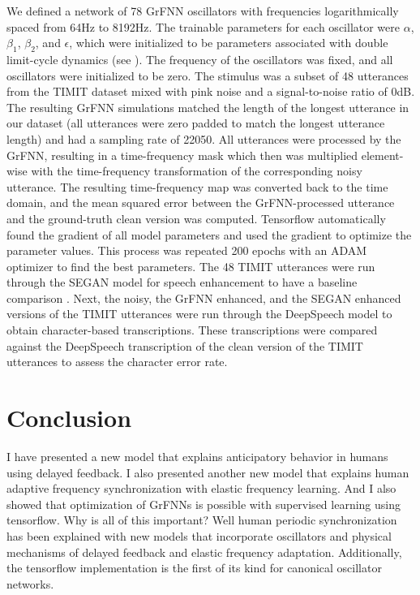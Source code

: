 \documentclass{report}
\begin{document}
We defined a network of 78 GrFNN oscillators with frequencies logarithmically spaced from 64Hz to 8192Hz. The trainable parameters for each oscillator were $\alpha$, $\beta_1$, $\beta_2$, and $\epsilon$, which were initialized to be parameters associated with double limit-cycle dynamics (see \cite{kim2015signal}). The frequency of the oscillators was fixed, and all oscillators were initialized to be zero. The stimulus was a subset of 48 utterances from the TIMIT dataset \cite{garofolo1993timit} mixed with pink noise and a signal-to-noise ratio of 0dB. The resulting GrFNN simulations matched the length of the longest utterance in our dataset (all utterances were zero padded to match the longest utterance length) and had a sampling rate of 22050. All utterances were processed by the GrFNN, resulting in a time-frequency mask which then was multiplied element-wise with the time-frequency transformation of the corresponding noisy utterance. The resulting time-frequency map was converted back to the time domain, and the mean squared error between the GrFNN-processed utterance and the ground-truth clean version was computed. Tensorflow automatically found the gradient of all model parameters and used the gradient to optimize the parameter values. This process was repeated 200 epochs with an ADAM optimizer \cite{kingma2014adam} to find the best parameters. The 48 TIMIT utterances were run through the SEGAN model for speech enhancement to have a baseline comparison \cite{pascual2017segan}. Next, the noisy, the GrFNN enhanced, and the SEGAN enhanced versions of the TIMIT utterances were run through the DeepSpeech model \cite{hannun2014deep} to obtain character-based transcriptions. These transcriptions were compared against the DeepSpeech transcription of the clean version of the TIMIT utterances to assess the character error rate. 


\chapter{Conclusion}
I have presented a new model that explains anticipatory behavior in humans using delayed feedback. I also presented another new model that explains human adaptive frequency synchronization with elastic frequency learning. And I also showed that optimization of GrFNNs is possible with supervised learning using tensorflow. Why is all of this important? Well human periodic synchronization has been explained with new models that incorporate oscillators and physical mechanisms of delayed feedback and elastic frequency adaptation. Additionally, the tensorflow implementation is the first of its kind for canonical oscillator networks.
\end{document}
